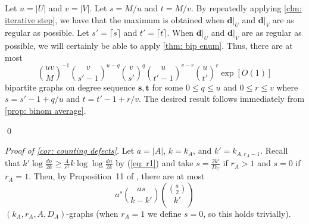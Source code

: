 \documentclass[11pt]{article}
\theoremstyle{plain}
\begin{document}
Let $u = |U|$ and $v = |V|$. Let $s = M/u$ and $t = M/v$.
By repeatedly applying \cref{clm: iterative step}, we have that the maximum is obtained when $\mathbf d|_U$ and $\mathbf d|_V$ are as regular as possible. Let $s' = \lceil s \rceil $ and $t' = \lceil t \rceil$. When $\mathbf d|_U$ and $\mathbf d|_V$ are as regular as possible, we will certainly be able to apply \cref{thm: bip enum}. Thus, there are at most 
\begin{equation}\label{eq: max sequence 1}
    \binom{uv}{M}^{-1}\binom{v}{s'-1}^{u - q}\binom{v}{s'}^q\binom{u}{t'-1}^{v - r}\binom{u}{t'}^r\exp[O(1)]
\end{equation}
bipartite graphs on degree sequence $\mathbf s, \mathbf t$ for some $0 \leq q \leq u$ and $0 \leq r \leq v$ where $s = s' - 1 + q/u$ and $t = t' - 1 + r/v$. The desired result follows immediately from \cref{prop: binom average}.





\qed

\medskip

\noindent\textit{Proof of \cref{cor: counting defects}.}
Let $a = |A|$, $k = k_A$, and $k' = k_{A, r_A - 1}$. Recall that $k'\log\frac{dn}{2k} \geq \frac{4}{\varepsilon^2}k\log\log\frac{dn}{2k}$ by (\ref{eq: r1}) and take $s = \frac{2k'}{D_{U}}$ if $r_A > 1$ and $s = 0$ if $r_A = 1$. Then, by Proposition~11 of \cite{osthus2003densities}, there are at most
\begin{equation}\label{eq: counting defects}
    a^s\binom{as}{k - k'}\binom{\binom{a}{2}}{k'}
\end{equation}
$(k_A, r_A, A, D_A)$-graphs (when $r_A = 1$ we define $s = 0$, so this holds trivially).
\end{document}
